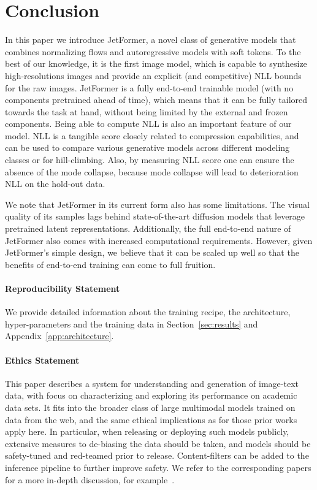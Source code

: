 \documentclass{article} %
\newcommand{\name}{JetFormer\xspace}
\begin{document}
\section{Conclusion}

In this paper we introduce \name, a novel class of generative models that combines normalizing flows and autoregressive models with soft tokens.
%
To the best of our knowledge, it is the first image model, which is capable to synthesize high-resolutions images and provide an explicit (and competitive) NLL bounds for the raw images.
%
\name is a fully end-to-end trainable model (with no components pretrained ahead of time), which means that it can be fully tailored towards the task at hand, without being limited by the external and frozen components.
%
Being able to compute NLL is also an important feature of our model. NLL is a tangible score closely related to compression capabilities, and can be used to compare various generative models across different modeling classes or for hill-climbing. Also, by measuring NLL score one can ensure the absence of the mode collapse, because mode collapse will lead to deterioration NLL on the hold-out data.

We note that \name in its current form also has some limitations. The visual quality of its samples lags behind state-of-the-art diffusion models that leverage pretrained latent representations. Additionally, the full end-to-end nature of \name also comes with increased computational requirements. However, given \name's simple design, we believe that it can be scaled up well so that the benefits of end-to-end training can come to full fruition.

\vspace{-1.5mm}

\paragraph{Reproducibility Statement} We provide detailed information about the training recipe, the architecture, hyper-parameters and the training data in Section~\ref{sec:results} and Appendix~\ref{app:architecture}.

\vspace{-1.5mm}

\paragraph{Ethics Statement} This paper describes a system for understanding and generation of image-text data, with focus on characterizing and exploring its performance on academic data sets. It fits into the broader class of large multimodal models trained on data from the web, and the same ethical implications as for those prior works apply here. In particular, when releasing or deploying such models publicly, extensive measures to de-biasing the data should be taken, and models should be safety-tuned and red-teamed prior to release. Content-filters can be added to the inference pipeline to further improve safety. We refer to the corresponding papers for a more in-depth discussion, for example~\citep{clip, palix, po2024state}.
\end{document}
